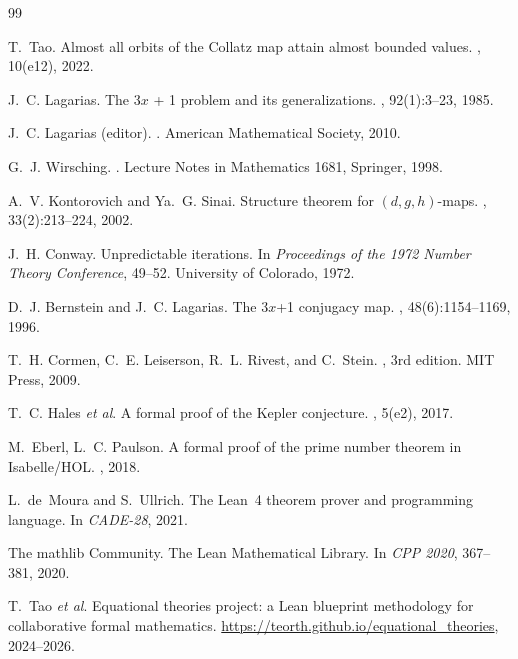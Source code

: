 \documentclass[11pt,a4paper]{article}
\theoremstyle{plain}
\theoremstyle{definition}
\begin{document}
\begin{thebibliography}{99}

T.~Tao.
\newblock Almost all orbits of the Collatz map attain almost bounded
values.
, 10(e12), 2022.

J.~C. Lagarias.
\newblock The 3$x$ + 1 problem and its generalizations.
, 92(1):3--23, 1985.

J.~C. Lagarias (editor).
.
\newblock American Mathematical Society, 2010.

G.~J. Wirsching.
.
\newblock Lecture Notes in Mathematics 1681, Springer, 1998.

A.~V. Kontorovich and Ya.~G. Sinai.
\newblock Structure theorem for $(d,g,h)$-maps.
,
33(2):213--224, 2002.

J.~H. Conway.
\newblock Unpredictable iterations.
\newblock In {\em Proceedings of the 1972 Number Theory Conference},
49--52. University of Colorado, 1972.

D.~J. Bernstein and J.~C. Lagarias.
\newblock The 3$x$+1 conjugacy map.
, 48(6):1154--1169, 1996.

T.~H. Cormen, C.~E. Leiserson, R.~L. Rivest, and C.~Stein.
, 3rd edition.
\newblock MIT Press, 2009.

T.~C. Hales \emph{et al}.
\newblock A formal proof of the Kepler conjecture.
, 5(e2), 2017.

M.~Eberl, L.~C. Paulson.
\newblock A formal proof of the prime number theorem in Isabelle/HOL.
, 2018.

L.~de~Moura and S.~Ullrich.
\newblock The Lean~4 theorem prover and programming language.
\newblock In {\em CADE-28}, 2021.

The mathlib Community.
\newblock The Lean Mathematical Library.
\newblock In {\em CPP 2020}, 367--381, 2020.

T.~Tao \emph{et al}.
\newblock Equational theories project: a Lean blueprint methodology
for collaborative formal mathematics.
\newblock \url{https://teorth.github.io/equational_theories}, 2024--2026.


\end{thebibliography}
\end{document}
